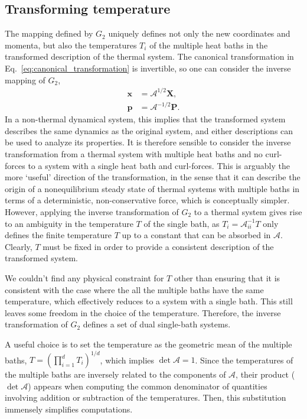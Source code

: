 \subsection{Transforming temperature}
The mapping defined by $G_2$ uniquely defines not only the new coordinates and momenta, but also the temperatures $T_i$ of the multiple heat baths in the transformed description of the thermal system. The canonical transformation in Eq.~\ref{eq:canonical_transformation} is invertible, so one can consider the inverse mapping of $G_2$,
\begin{equation}\label{eq:inverse_canonical_transformation}
\begin{split}
    \mathbf x &= \mathcal A^{1/2}\mathbf X,\\
    \mathbf p &= \mathcal A^{-1/2} \mathbf P.
\end{split}
\end{equation}
In a non-thermal dynamical system, this implies that the transformed system describes the same dynamics as the original system, and either descriptions can be used to analyze its properties.
It is therefore sensible to consider the inverse transformation from a thermal system with multiple heat baths and no curl-forces to a system with a single heat bath and curl-forces. This is arguably the more `useful' direction of the transformation, in the sense that it can describe the origin of a nonequilibrium steady state of thermal systems with multiple baths in terms of a deterministic, non-conservative force, which is conceptually simpler. However, applying the inverse transformation of $G_2$ to a thermal system gives rise to an ambiguity in the temperature $T$ of the single bath, as $T_i=\mathcal{A}_{ii}^{-1}T$ only defines the finite temperature $T$ up to a constant that can be absorbed in $\mathcal{A}$. Clearly, $T$ must be fixed in order to provide a consistent description of the transformed system.

We couldn't find any physical constraint for $T$ other than ensuring that it is consistent with the case where the all the multiple baths have the same temperature, which effectively reduces to a system with a single bath. This still leaves some freedom in the choice of the temperature. Therefore, the inverse transformation of $G_2$ defines a set of dual single-bath systems.

A useful choice is to set the temperature as the geometric mean of the multiple baths, $T=\left(\prod_{i=1}^d T_i\right)^{1/d}$, which implies $\det \mathcal A=1$. Since the temperatures of the multiple baths are inversely related to the components of $\mathcal{A}$, their product ($\det \mathcal{A}$) appears when computing the common denominator of quantities involving addition or subtraction of the temperatures. Then, this substitution immensely simplifies computations.


